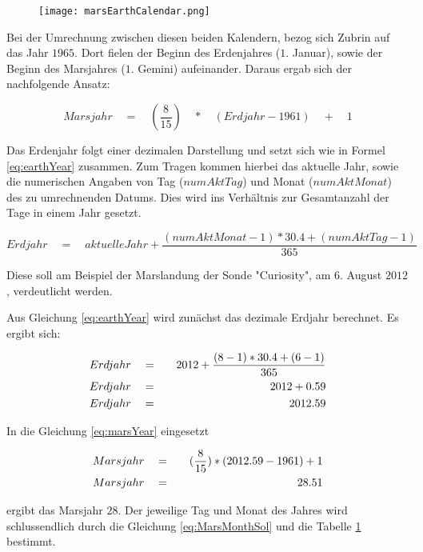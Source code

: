 \begin{figure}[H]
	\centering
	\texttt{[image: marsEarthCalendar.png]}
	\label{fig:marsEarthCalendar}
\end{figure}

Bei der Umrechnung zwischen diesen beiden Kalendern, bezog sich Zubrin auf das
Jahr $1965$. Dort fielen der Beginn des Erdenjahres ($1.$ Januar), sowie der
Beginn des Marsjahres ($1.$ Gemini) aufeinander. Daraus ergab sich der
nachfolgende Ansatz:

\begin{equation}
	Marsjahr \quad = \quad (\frac{8}{15}) \quad * \quad (Erdjahr - 1961) \quad + \quad 1
	\label{eq:marsYear}
\end{equation}

Das Erdenjahr folgt einer dezimalen Darstellung und setzt sich wie in Formel
\ref{eq:earthYear} zusammen. Zum Tragen kommen hierbei das aktuelle Jahr, sowie
die numerischen Angaben von Tag ($numAktTag$) und Monat ($numAktMonat$) des zu
umrechnenden Datums. Dies wird ins Verh{\"a}ltnis zur Gesamtanzahl der Tage in einem
Jahr gesetzt.

\begin{equation}
	Erdjahr \quad = \quad aktuelleJahr + \frac{ (numAktMonat - 1) * 30.4 + (numAktTag - 1) }{365}
	\label{eq:earthYear}
\end{equation}

Diese soll am Beispiel der Marslandung der Sonde "Curiosity", am $6.$ August
$2012$, verdeutlicht werden.

Aus Gleichung \ref{eq:earthYear} wird zun{\"a}chst das dezimale Erdjahr berechnet.
Es ergibt sich:

\begin{eqnarray}
	Erdjahr \quad & = & \quad 2012 + \frac{ (8-1) * 30.4 + (6-1) }{365} \notag\\
	Erdjahr \quad & = & \quad 2012 + 0.59 \notag\\
	Erdjahr \quad & = & \quad 2012.59
\end{eqnarray}

In die Gleichung \ref{eq:marsYear} eingesetzt

\begin{eqnarray}
	Marsjahr \quad & = & \quad (\frac{8}{15}) * (2012.59 - 1961) + 1 \notag\\
	Marsjahr \quad & = & \quad 28.51
\end{eqnarray}

ergibt das Marsjahr $28$. Der jeweilige Tag und Monat des Jahres wird
schlussendlich durch die Gleichung \ref{eq:MarsMonthSol} und die Tabelle
\ref{fig:marsEarthCalendar} bestimmt.

